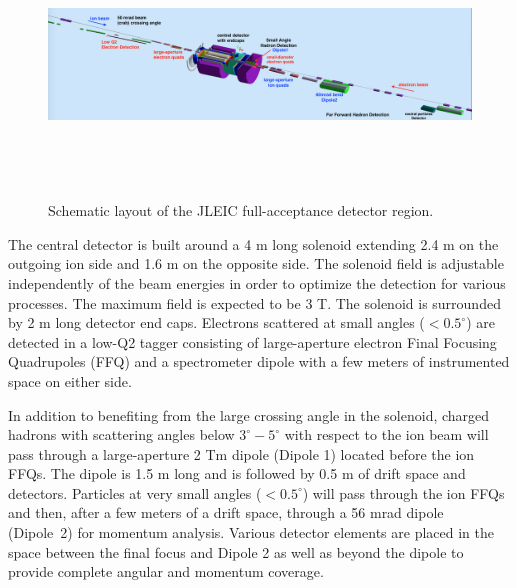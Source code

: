\begin{figure}[!htb]
\centering
\includegraphics[width=.98\textwidth,height=7cm]{../../img/detector_schematic2.png}
\caption{Schematic layout of the JLEIC full-acceptance detector region.}
\label{fig:detector_schematic}
\end{figure}

The central detector is built around a 4 m long solenoid extending 2.4 m on the outgoing ion side and 1.6 m on the opposite side. The solenoid field is adjustable independently of the beam energies in order to optimize the detection for various processes. The maximum field is expected to be 3 T. The solenoid is surrounded by 2 m long detector end caps. Electrons scattered at small angles ($<0.5^{\circ}$) are detected in a low-Q2 tagger consisting of large-aperture electron Final Focusing Quadrupoles (FFQ) and a spectrometer dipole with a few meters of instrumented space on either side.

In addition to benefiting from the large crossing angle in the solenoid, charged hadrons with scattering angles below $3^{\circ}-5^{\circ}$ with respect to the ion beam will pass through a large-aperture 2 Tm dipole (Dipole 1) located before the ion FFQs. The dipole is 1.5 m long and is followed by 0.5 m of drift space and detectors. Particles at very small angles ($<0.5^{\circ}$)  will pass through the ion FFQs and then, after a few meters of a drift space, through a 56 mrad dipole (Dipole 2) for momentum analysis. Various detector elements are placed in the space between the final focus and Dipole 2 as well as beyond the dipole to provide complete angular and momentum coverage.

